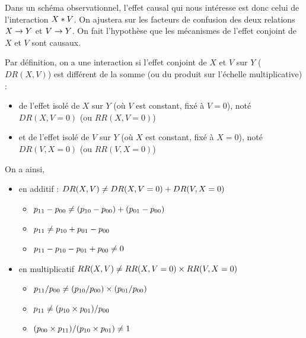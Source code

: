 \documentclass[
]{book}
\providecommand{\tightlist}{%
  \setlength{\itemsep}{0pt}\setlength{\parskip}{0pt}}
\begin{document}
Dans un schéma observationnel, l'effet causal qui nous intéresse est donc celui de l'interaction \(\small X*V\). On ajustera sur les facteurs de confusion des deux relations \(\small X \rightarrow Y\) et \(\small V \rightarrow Y\).
On fait l'hypothèse que les mécanismes de l'effet conjoint de \(X\) et \(V\) sont causaux.

Par définition, on a une interaction si l'effet conjoint de \(X\) et \(V\) sur \(Y\) (\(DR(X,V)\)) est différent de la somme (ou du produit sur l'échelle multiplicative) :

\begin{itemize}
\tightlist
\item
  de l'effet isolé de \(X\) sur \(Y\) (où \(V\) est constant, fixé à \(V=0\)), noté \(DR(X,V=0)\) (ou \(RR(X,V=0)\))
\item
  et de l'effet isolé de \(V\) sur \(Y\) (où \(X\) est constant, fixé à \(X=0\)), noté \(DR(V,X=0)\) (ou \(RR(V,X=0)\))
\end{itemize}

On a ainsi,

\begin{itemize}
\tightlist
\item
  en additif : \(\small DR(X,V) \neq DR(X,V=0) + DR(V,X=0)\)

  \begin{itemize}
  \tightlist
  \item
    \(\small p_{11}-p_{00} \neq (p_{10}-p_{00})+(p_{01}-p_{00})\)
  \item
    \(\small p_{11} \neq p_{10} + p_{01} - p_{00}\)
  \item
    \(\small p_{11} - p_{10} - p_{01} + p_{00} \neq 0\)
  \end{itemize}
\item
  en multiplicatif \(\small RR(X,V) \neq RR(X,V=0) \times RR(V,X=0)\)

  \begin{itemize}
  \tightlist
  \item
    \(\small p_{11}/p_{00} \neq (p_{10}/p_{00}) \times (p_{01}/p_{00})\)
  \item
    \(\small p_{11} \neq (p_{10} \times p_{01}) / p_{00}\)
  \item
    \(\small (p_{00} \times p_{11}) / (p_{10} \times p_{01}) \neq 1\)
  \end{itemize}
\end{itemize}
\end{document}
